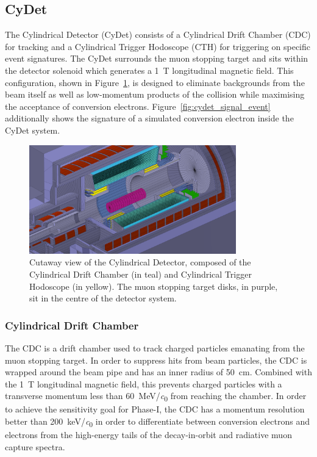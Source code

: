 \subsection{CyDet}
The Cylindrical Detector (CyDet) consists of a Cylindrical Drift Chamber (CDC)
for tracking and a Cylindrical Trigger Hodoscope (CTH) for triggering on
specific event signatures. The CyDet surrounds the muon stopping target and sits
within the detector solenoid which generates a \SI{1}{\tesla} longitudinal
magnetic field. This configuration, shown in Figure~\ref{fig:cydet}, is designed
to eliminate backgrounds from the beam itself as well as low-momentum products
of the collision while maximising the acceptance of conversion electrons.
Figure~\ref{fig:cydet_signal_event} additionally shows the signature of a
simulated conversion electron inside the CyDet system.

\begin{figure}
    \centering
    \includegraphics[width=0.8\textwidth]{chapter2/cydet_recolor.png}
    \caption{ Cutaway view of the Cylindrical Detector, composed of the
        Cylindrical Drift Chamber (in teal) and Cylindrical Trigger Hodoscope
        (in yellow). The muon stopping target disks, in purple, sit in the
        centre of the detector system. }
    \label{fig:cydet}
\end{figure}

\subsubsection{Cylindrical Drift Chamber}
The CDC is a drift chamber used to track charged particles emanating from the
muon stopping target. In order to suppress hits from beam particles, the CDC is
wrapped around the beam pipe and has an inner radius of \SI{50}{\cm}. Combined
with the \SI{1}{\tesla} longitudinal magnetic field, this prevents charged
particles with a transverse momentum less than \SI{60}{\MeV/\clight} from
reaching the chamber. In order to achieve the sensitivity goal for Phase-I, the
CDC has a momentum resolution better than \SI{200}{\keV/\clight} in order to
differentiate between conversion electrons and electrons from the high-energy
tails of the decay-in-orbit and radiative muon capture spectra. 

